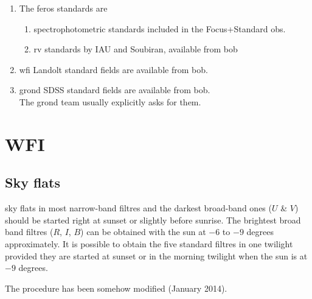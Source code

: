 \documentclass[11pt,fleqn,a4paper]{book}
\begin{document}
\begin{enumerate}
\begin{enumerate}
        \item The \gls{feros} standards are
        \begin{enumerate}
            \item \Glspl{spectrophotometric standard} included in the Focus+Standard \glspl{ob}.
            \item \Glspl{rv standard} by IAU and Soubiran, available from \gls{bob}
        \end{enumerate}
        \item \gls{wfi} Landolt \glspl{standard field} are available from \gls{bob}.
        \item \gls{grond} SDSS \glspl{standard field} are available from \gls{bob}.\\
            The \gls{grond} team usually explicitly asks for them.    
    \end{enumerate}
\end{enumerate}

\section{WFI}


\subsection{Sky flats}
\label{sec:wfiflats}
\Gls{sky flats} in most narrow-band filtres and the darkest broad-band ones ($U$ \& $V$) should be started right at sunset or slightly before sunrise.  The brightest
broad band filtres ($R$, $I$, $B$) can be obtained with the sun at $-6$ to
$-9$ degrees approximately.  It is possible to obtain the five standard filtres in one twilight provided they are started at sunset or in the morning twilight when the sun is at $-9$ degrees.

The procedure has been somehow modified (January 2014).  
\end{document}
